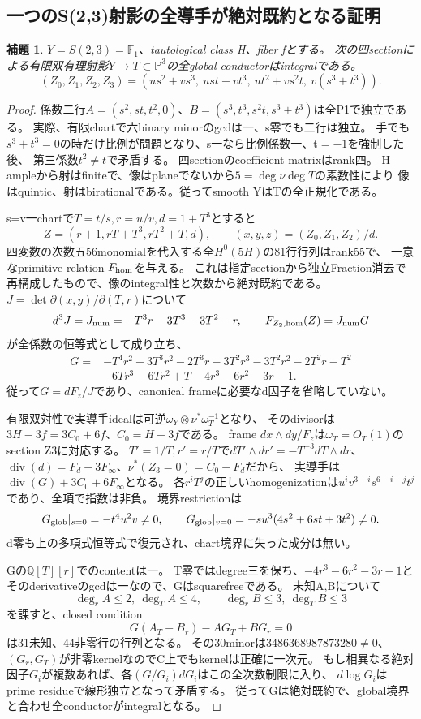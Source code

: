 \documentclass[a4paper,11pt]{ltjsarticle}
\newtheorem{lemma}[proposition]{補題}
\theoremstyle{definition}
\begin{document}
\subsection{一つのS(2,3)射影の全導手が絶対既約となる証明}
\begin{lemma}\label{lem:scroll23-integral-conductor}
$Y=S(2,3)=\mathbb F_1$、tautological class H、fiber fとする。
次の四sectionによる有限双有理射影$Y\to T\subset\mathbb P^3$の全global conductorはintegralである。
\[
 (Z_0,Z_1,Z_2,Z_3)=
 (us^2+vs^3,\ ust+vt^3,\ ut^2+vs^2t,\ v(s^3+t^3)).
\]
\end{lemma}
\begin{proof}
係数二行$A=(s^2,st,t^2,0)$、$B=(s^3,t^3,s^2t,s^3+t^3)$は全P1で独立である。
実際、有限chartで六binary minorのgcdは一、s零でも二行は独立。
手でも$s^3+t^3=0$の時だけ比例が問題となり、s一なら比例係数一、t$=-1$を強制した後、
第三係数$t^2\ne t$で矛盾する。
四sectionのcoefficient matrixはrank四。
H ampleから射はfiniteで、像はplaneでないから$5=\deg\nu\deg T$の素数性により
像はquintic、射はbirationalである。従ってsmooth YはTの全正規化である。

s=v一chartで$T=t/s,r=u/v,d=1+T^3$とすると
\[
 Z=(r+1,rT+T^3,rT^2+T,d),\qquad (x,y,z)=(Z_0,Z_1,Z_2)/d.
\]
四変数の次数五56monomialを代入する全$H^0(5H)$の81行行列はrank55で、
一意なprimitive relation $F_{\rm hom}$を与える。
これは指定sectionから独立Fraction消去で再構成したもので、像のintegral性と次数から絶対既約である。
$J=\det\partial(x,y)/\partial(T,r)$について
\[
 d^3J=J_{\rm num}=-T^3r-3T^3-3T^2-r,
 \qquad F_{Z_2,\rm hom}(Z)=J_{\rm num}G
\]
が全係数の恒等式として成り立ち、
\[
\begin{aligned}
 G={}&-T^4r^2-3T^3r^2-2T^3r-3T^2r^3-3T^2r^2-2T^2r-T^2\\
     &-6Tr^3-6Tr^2+T-4r^3-6r^2-3r-1.
\end{aligned}
\]
従って$G=dF_z/J$であり、canonical frameに必要なd因子を省略していない。

有限双対性で実導手idealは可逆$\omega_Y\otimes\nu^*\omega_T^{-1}$となり、
そのdivisorは$3H-3f=3C_0+6f$、$C_0=H-3f$である。
frame $dx\wedge dy/F_z$は$\omega_T=O_T(1)$のsection Z3に対応する。
$T'=1/T,r'=r/T$で$dT'\wedge dr'=-T^{-3}dT\wedge dr$、
$\operatorname{div}(d)=F_d-3F_\infty$、$\nu^*(Z_3=0)=C_0+F_d$だから、
実導手は$\operatorname{div}(G)+3C_0+6F_\infty$となる。
各$r^iT^j$の正しいhomogenizationは$u^iv^{3-i}s^{6-i-j}t^j$であり、全項で指数は非負。
境界restrictionは
\[
 G_{\rm glob}|_{s=0}=-t^4u^2v\ne0,\qquad
 G_{\rm glob}|_{v=0}=-su^3(4s^2+6st+3t^2)\ne0.
\]
d零も上の多項式恒等式で復元され、chart境界に失った成分は無い。

Gの$\mathbb Q[T][r]$でのcontentは一。
T零ではdegree三を保ち、$-4r^3-6r^2-3r-1$とそのderivativeのgcdは一なので、Gはsquarefreeである。
未知A,Bについて
\[
 \deg_r A\le2,\ \deg_T A\le4,\qquad
 \deg_r B\le3,\ \deg_T B\le3
\]
を課すと、closed condition
\[
 G(A_T-B_r)-AG_T+BG_r=0
\]
は31未知、44非零行の行列となる。
その30minorは$3486368987873280\ne0$、$(G_r,G_T)$が非零kernelなのでC上でもkernelは正確に一次元。
もし相異なる絶対因子$G_i$が複数あれば、各$(G/G_i)dG_i$はこの全次数制限に入り、
$d\log G_i$はprime residueで線形独立となって矛盾する。
従ってGは絶対既約で、global境界と合わせ全conductorがintegralとなる。
\end{proof}
\end{document}
